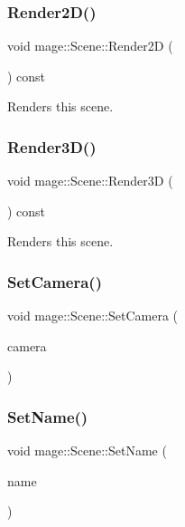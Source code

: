 \subsubsection{\texorpdfstring{Render2\+D()}{Render2D()}}
{\footnotesize\ttfamily void mage\+::\+Scene\+::\+Render2D (\begin{DoxyParamCaption}{ }\end{DoxyParamCaption}) const}

Renders this scene. \hypertarget{classmage_1_1_scene_a51d2d441067d30cf3a444d6a80811f93}{}\label{classmage_1_1_scene_a51d2d441067d30cf3a444d6a80811f93} 
\subsubsection{\texorpdfstring{Render3\+D()}{Render3D()}}
{\footnotesize\ttfamily void mage\+::\+Scene\+::\+Render3D (\begin{DoxyParamCaption}{ }\end{DoxyParamCaption}) const}

Renders this scene. \hypertarget{classmage_1_1_scene_a57718151e0102306b3abb22da45ae27a}{}\label{classmage_1_1_scene_a57718151e0102306b3abb22da45ae27a} 
\subsubsection{\texorpdfstring{Set\+Camera()}{SetCamera()}}
{\footnotesize\ttfamily void mage\+::\+Scene\+::\+Set\+Camera (\begin{DoxyParamCaption}\item[{\hyperlink{namespacemage_a1e01ae66713838a7a67d30e44c67703e}{Shared\+Ptr}$<$ \hyperlink{classmage_1_1_camera}{Camera} $>$}]{camera }\end{DoxyParamCaption})}

\hypertarget{classmage_1_1_scene_a9b7c1c2f84cc3b3c5ff3de4f29d830e9}{}\label{classmage_1_1_scene_a9b7c1c2f84cc3b3c5ff3de4f29d830e9} 
\subsubsection{\texorpdfstring{Set\+Name()}{SetName()}}
{\footnotesize\ttfamily void mage\+::\+Scene\+::\+Set\+Name (\begin{DoxyParamCaption}\item[{const string \&}]{name }\end{DoxyParamCaption})}

